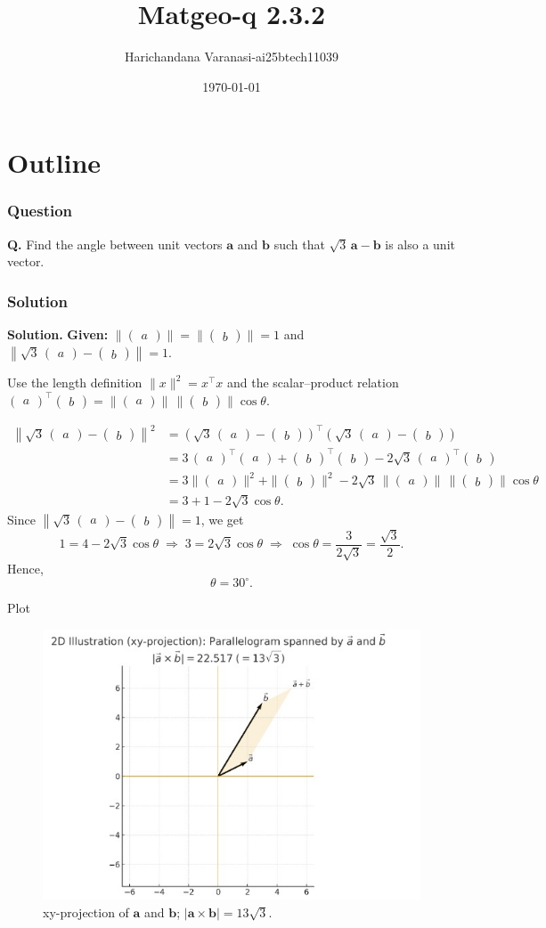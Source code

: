 \documentclass{beamer}
\title{Matgeo-q 2.3.2}
\author{Harichandana Varanasi-ai25btech11039}
\date{\today}
\theoremstyle{remark}
\newcommand{\myvec}[1]{\ensuremath{\begin{pmatrix}#1\end{pmatrix}}}
\let\vec\mathbf
\begin{document}
\begin{frame}
\titlepage
\end{frame}

\section*{Outline}

\begin{frame}
\frametitle{Question}
\textbf{Q.}\; Find the angle between unit vectors $\vec a$ and $\vec b$ such that $\sqrt{3}\,\vec a-\vec b$ is also a unit vector.

\end{frame}
%
\begin{frame}
\frametitle{Solution}

\textbf{Solution.}
\textbf{Given:} $\|\myvec{a}\|=\|\myvec{b}\|=1$ and $\left\|\sqrt{3}\,\myvec{a}-\myvec{b}\right\|=1$.

\medskip
 Use the length definition $\|x\|^2=x^\top x$ and the scalar–product relation
$\myvec{a}^\top\myvec{b}=\|\myvec{a}\|\,\|\myvec{b}\|\cos\theta$.


\medskip

\[
\begin{aligned}
\left\|\sqrt{3}\,\myvec{a}-\myvec{b}\right\|^2
&= \left(\sqrt{3}\,\myvec{a}-\myvec{b}\right)^\top\!\left(\sqrt{3}\,\myvec{a}-\myvec{b}\right)\\
&= 3\,\myvec{a}^\top\myvec{a}+\myvec{b}^\top\myvec{b}-2\sqrt{3}\,\myvec{a}^\top\myvec{b}\\
&= 3\|\myvec{a}\|^2+\|\myvec{b}\|^2-2\sqrt{3}\,\|\myvec{a}\|\,\|\myvec{b}\|\cos\theta\\
&= 3+1-2\sqrt{3}\cos\theta.
\end{aligned}
\]
Since $\left\|\sqrt{3}\,\myvec{a}-\myvec{b}\right\|=1$, we get
\[
1=4-2\sqrt{3}\cos\theta
\;\Longrightarrow\;
3=2\sqrt{3}\cos\theta
\;\Longrightarrow\;
\cos\theta=\frac{3}{2\sqrt{3}}=\frac{\sqrt{3}}{2}.
\]
Hence,
\[
\boxed{\theta=30^\circ}.
\]

\end{frame}
\begin{frame}{Plot}
    \begin{figure}[h!]
\centering
\includegraphics[width=0.7\linewidth]{figs/matgeo2.3.2.jpeg}
\caption{xy-projection of $\vec a$ and $\vec b$; $|\vec a\times\vec b|=13\sqrt{3}$.}

\end{figure}
\end{frame}
\end{document}
